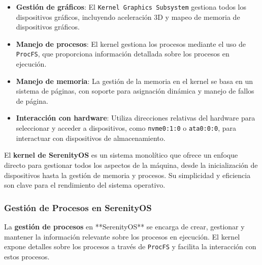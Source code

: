 \begin{itemize}
  \item \textbf{Gestión de gráficos}: El \texttt{Kernel Graphics Subsystem} gestiona todos los dispositivos gráficos, incluyendo aceleración 3D y mapeo de memoria de dispositivos gráficos.
  \item \textbf{Manejo de procesos}: El kernel gestiona los procesos mediante el uso de \texttt{ProcFS}, que proporciona información detallada sobre los procesos en ejecución.
  \item \textbf{Manejo de memoria}: La gestión de la memoria en el kernel se basa en un sistema de páginas, con soporte para asignación dinámica y manejo de fallos de página.
  \item \textbf{Interacción con hardware}: Utiliza direcciones relativas del hardware para seleccionar y acceder a dispositivos, como \texttt{nvme0:1:0} o \texttt{ata0:0:0}, para interactuar con dispositivos de almacenamiento.
\end{itemize}

El \textbf{kernel de SerenityOS} es un sistema monolítico que ofrece un enfoque directo para gestionar todos los aspectos de la máquina, desde la inicialización de dispositivos hasta la gestión de memoria y procesos. Su simplicidad y eficiencia son clave para el rendimiento del sistema operativo.



\subsubsection{Gestión de Procesos en SerenityOS}

La \textbf{gestión de procesos} en **SerenityOS** se encarga de crear, gestionar y mantener la información relevante sobre los procesos en ejecución. El kernel expone detalles sobre los procesos a través de \texttt{ProcFS} y facilita la interacción con estos procesos.

